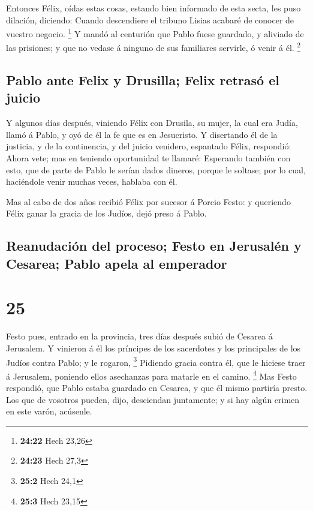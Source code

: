  Entonces Félix, oídas estas cosas, estando bien informado
de esta secta, les puso dilación, diciendo: Cuando descendiere el
tribuno Lisias acabaré de conocer de vuestro negocio. \footnote{\textbf{24:22}
  Hech 23,26}  Y mandó al centurión que Pablo fuese
guardado, y aliviado de las prisiones; y que no vedase á ninguno de sus
familiares servirle, ó venir á él. \footnote{\textbf{24:23} Hech 27,3}

\hypertarget{pablo-ante-felix-y-drusilla-felix-retrasuxf3-el-juicio}{%
\subsection{Pablo ante Felix y Drusilla; Felix retrasó el
juicio}\label{pablo-ante-felix-y-drusilla-felix-retrasuxf3-el-juicio}}

 Y algunos días después, viniendo Félix con Drusila, su
mujer, la cual era Judía, llamó á Pablo, y oyó de él la fe que es en
Jesucristo.  Y disertando él de la justicia, y de la
continencia, y del juicio venidero, espantado Félix, respondió: Ahora
vete; mas en teniendo oportunidad te llamaré:  Esperando
también con esto, que de parte de Pablo le serían dados dineros, porque
le soltase; por lo cual, haciéndole venir muchas veces, hablaba con él.

 Mas al cabo de dos años recibió Félix por sucesor á Porcio
Festo: y queriendo Félix ganar la gracia de los Judíos, dejó preso á
Pablo.

\hypertarget{reanudaciuxf3n-del-proceso-festo-en-jerusaluxe9n-y-cesarea-pablo-apela-al-emperador}{%
\subsection{Reanudación del proceso; Festo en Jerusalén y Cesarea; Pablo
apela al
emperador}\label{reanudaciuxf3n-del-proceso-festo-en-jerusaluxe9n-y-cesarea-pablo-apela-al-emperador}}

\hypertarget{section-24}{%
\section{25}\label{section-24}}

 Festo pues, entrado en la provincia, tres días después
subió de Cesarea á Jerusalem.  Y vinieron á él los príncipes
de los sacerdotes y los principales de los Judíos contra Pablo; y le
rogaron, \footnote{\textbf{25:2} Hech 24,1}  Pidiendo gracia
contra él, que le hiciese traer á Jerusalem, poniendo ellos asechanzas
para matarle en el camino. \footnote{\textbf{25:3} Hech 23,15}
 Mas Festo respondió, que Pablo estaba guardado en Cesarea,
y que él mismo partiría presto.  Los que de vosotros pueden,
dijo, desciendan juntamente; y si hay algún crimen en este varón,
acúsenle.

